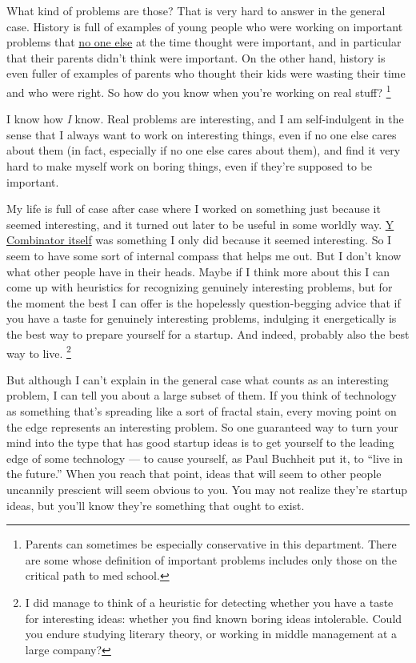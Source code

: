 What kind of problems are those? That is very hard to answer in the
general case. History is full of examples of young people who were
working on important problems that \href{marginal.html}{no one else} at
the time thought were important, and in particular that their parents
didn't think were important. On the other hand, history is even fuller
of examples of parents who thought their kids were wasting their time
and who were right. So how do you know when you're working on real
stuff? \footnote{Parents can sometimes be especially conservative in this
department. There are some whose definition of important problems
includes only those on the critical path to med school.}

I know how \emph{I} know. Real problems are interesting, and I am
self-indulgent in the sense that I always want to work on interesting
things, even if no one else cares about them (in fact, especially if no
one else cares about them), and find it very hard to make myself work on
boring things, even if they're supposed to be important.

My life is full of case after case where I worked on something just
because it seemed interesting, and it turned out later to be useful in
some worldly way. \href{http://ycombinator.com/start.html}{Y Combinator
itself} was something I only did because it seemed interesting. So I
seem to have some sort of internal compass that helps me out. But I
don't know what other people have in their heads. Maybe if I think more
about this I can come up with heuristics for recognizing genuinely
interesting problems, but for the moment the best I can offer is the
hopelessly question-begging advice that if you have a taste for
genuinely interesting problems, indulging it energetically is the best
way to prepare yourself for a startup. And indeed, probably also the
best way to live. \footnote{I did manage to think of a heuristic for detecting whether you
have a taste for interesting ideas: whether you find known boring ideas
intolerable. Could you endure studying literary theory, or working in
middle management at a large company?}

But although I can't explain in the general case what counts as an
interesting problem, I can tell you about a large subset of them. If you
think of technology as something that's spreading like a sort of fractal
stain, every moving point on the edge represents an interesting problem.
So one guaranteed way to turn your mind into the type that has good
startup ideas is to get yourself to the leading edge of some technology
--- to cause yourself, as Paul Buchheit put it, to ``live in the
future.'' When you reach that point, ideas that will seem to other
people uncannily prescient will seem obvious to you. You may not realize
they're startup ideas, but you'll know they're something that ought to
exist.

